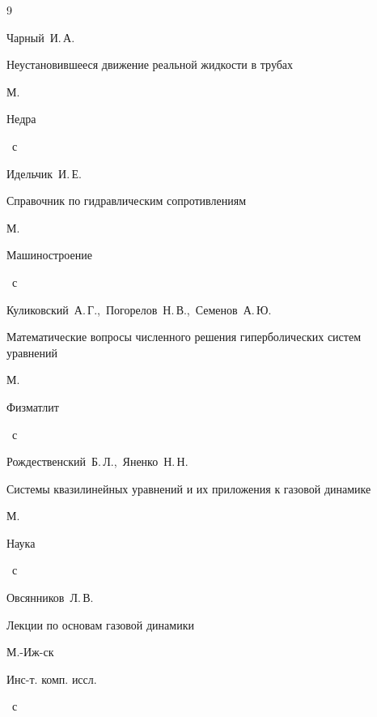 \begin{thebibliography}{9}

\by Чарный~И.\,А.

\book Неустановившееся движение реальной жидкости в трубах

\publaddr М.

\publ Недра


~с






\by Идельчик~И.\,Е.

\book Справочник по гидравлическим сопротивлениям

\publaddr М.

\publ Машиностроение


~с






\by Куликовский~А.\,Г.,~Погорелов~Н.\,В.,~Семенов~А.\,Ю.

\book Математические вопросы численного решения гиперболических систем уравнений

\publaddr М.

\publ Физматлит


~с




\by Рождественский~Б.\,Л.,~Яненко~Н.\,Н.

\book Системы квазилинейных уравнений и их приложения к газовой динамике

\publaddr М.

\publ Наука


~с






\by Овсянников~Л.\,В.

\book Лекции по основам газовой динамики

\publaddr М.-Иж-ск

\publ Инс-т. комп. иссл.


~с






\end{thebibliography}
